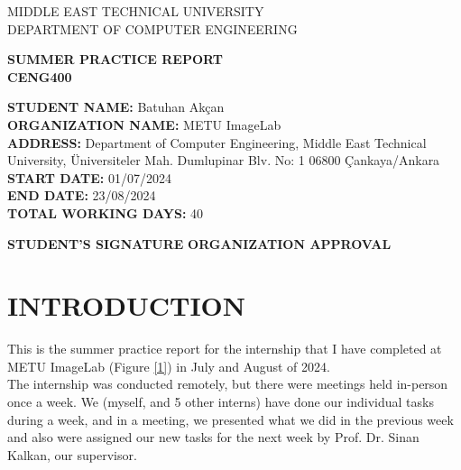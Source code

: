 \documentclass{article}
\begin{document}
\begin{center}
{\Large MIDDLE EAST TECHNICAL UNIVERSITY\\
DEPARTMENT OF COMPUTER ENGINEERING\\}

\vspace{1cm}

{\huge \textbf{SUMMER PRACTICE REPORT\\
CENG400\\}}
\end{center}

\vspace{1cm}

{\large \noindent
\textbf{STUDENT NAME:} Batuhan Akçan\vspace{0.3cm}\\
\textbf{ORGANIZATION NAME:} METU ImageLab\vspace{0.3cm}\\
\textbf{ADDRESS:} Department of Computer Engineering, Middle East Technical University, Üniversiteler Mah. Dumlupinar Blv. No: 1 06800 Çankaya/Ankara\vspace{0.3cm}\\
\textbf{START DATE:} 01/07/2024\vspace{0.3cm}\\
\textbf{END DATE:} 23/08/2024\vspace{0.3cm}\\
\textbf{TOTAL WORKING DAYS:} 40\\}

\vspace{1cm}

\noindent
\textbf{STUDENT'S SIGNATURE}
\hspace{1.5cm}
\textbf{ORGANIZATION APPROVAL}

\newpage

\tableofcontents
\newpage

\section{INTRODUCTION}
\hspace{0.5cm}
This is the summer practice report for the internship that I have completed at METU ImageLab (Figure \ref{1}) in July and August of 2024.\\

The internship was conducted remotely, but there were meetings held in-person once a week. We (myself, and 5 other interns) have done our individual tasks during a week, and in a meeting, we presented what we did in the previous week and also were assigned our new tasks for the next week by Prof. Dr. Sinan Kalkan, our supervisor.\\
\end{document}
